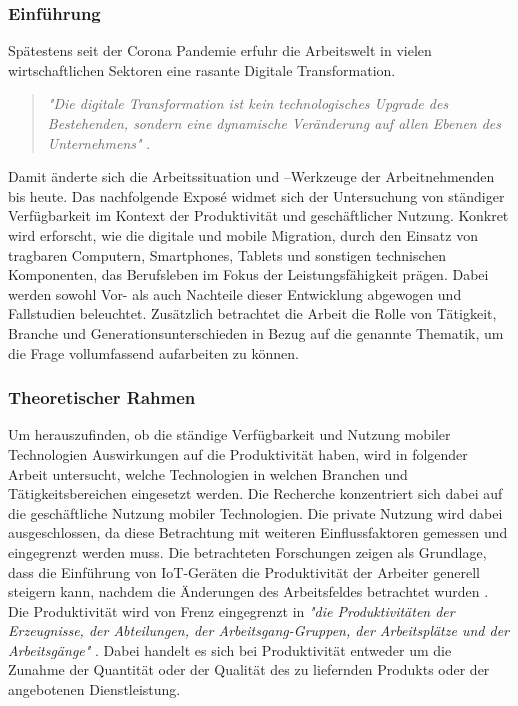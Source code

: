 \documentclass[12pt,a4paper]{article}
\title{\titlename}
\author{Reichard, Pia~~~Berger, Vivian~~~Engelhard, Phillib~~~Müller, Maximilian}
\date{\exposedate}
\begin{document}

\maketitle 
\thispagestyle{empty} %
\newpage	

\subsubsection*{Einführung }
Spätestens seit der Corona Pandemie erfuhr die Arbeitswelt in vielen wirtschaftlichen Sektoren eine rasante Digitale Transformation.

\begin{quote}
\emph{"Die digitale Transformation ist kein technologisches Upgrade des Bestehenden, sondern eine dynamische Veränderung auf allen Ebenen des Unternehmens"} \parencite{frauenhofer}.
\end{quote}

Damit änderte sich die Arbeitssituation und –Werkzeuge der Arbeitnehmenden bis heute. Das nachfolgende Exposé widmet sich der Untersuchung von ständiger Verfügbarkeit im Kontext der Produktivität und geschäftlicher Nutzung. Konkret wird erforscht, wie die digitale und mobile Migration, durch den Einsatz von tragbaren Computern, Smartphones, Tablets und sonstigen technischen Komponenten, das Berufsleben im Fokus der Leistungsfähigkeit prägen. Dabei werden sowohl Vor- als auch Nachteile dieser Entwicklung abgewogen und Fallstudien beleuchtet. Zusätzlich betrachtet die Arbeit die Rolle von Tätigkeit, Branche und Generationsunterschieden in Bezug auf die genannte Thematik, um die Frage vollumfassend aufarbeiten zu können.

\subsubsection*{Theoretischer Rahmen}
Um herauszufinden, ob die ständige Verfügbarkeit und Nutzung mobiler Technologien Auswirkungen auf die Produktivität haben, wird in folgender Arbeit untersucht, welche Technologien in welchen Branchen und Tätigkeitsbereichen eingesetzt werden. 
Die Recherche konzentriert sich dabei auf die geschäftliche Nutzung mobiler Technologien.  
Die private Nutzung wird dabei ausgeschlossen, da diese Betrachtung mit weiteren Einflussfaktoren gemessen und eingegrenzt werden muss.
Die betrachteten Forschungen zeigen als Grundlage, dass die Einführung von IoT-Geräten die Produktivität der Arbeiter generell steigern kann, nachdem die Änderungen des Arbeitsfeldes betrachtet wurden \parencite[vgl.][]{nappi2020internet}.
Die Produktivität wird von Frenz eingegrenzt in \emph{"die Produktivitäten der Erzeugnisse, der Abteilungen, der Arbeitsgang-Gruppen, der Arbeitsplätze und der Arbeitsgänge"} \parencite{frenz1963definition}.
Dabei handelt es sich bei Produktivität entweder um die Zunahme der Quantität oder der Qualität des zu liefernden Produkts oder der angebotenen Dienstleistung. 
\end{document}
